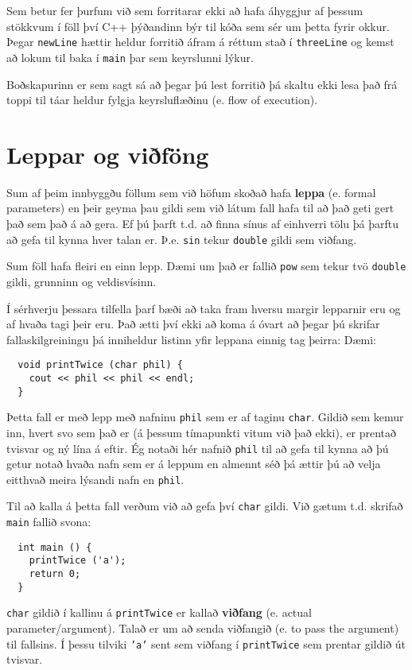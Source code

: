 Sem betur fer þurfum við sem forritarar ekki að hafa áhyggjur af þessum stökkvum í föll því C++ þýðandinn býr til kóða sem sér um þetta fyrir okkur.
Þegar {\tt newLine} hættir heldur forritið áfram á réttum stað í {\tt threeLine} og kemst að lokum til baka í {\tt main} þar sem keyrslunni lýkur.

Boðskapurinn er sem sagt sá að þegar þú lest forritið þá skaltu ekki lesa það frá toppi til táar heldur fylgja keyrsluflæðinu (e. flow of execution).

\section {Leppar og viðföng}

Sum af þeim innbyggðu föllum sem við höfum skoðað hafa {\bf leppa} (e. formal parameters)
en þeir geyma þau gildi sem við látum fall hafa til að það geti gert það sem það á að gera.
Ef þú þarft t.d. að finna sínus af einhverri tölu þá þarftu að gefa til kynna hver talan er.
Þ.e. {\tt sin} tekur {\tt double} gildi sem viðfang.

Sum föll hafa fleiri en einn lepp.
Dæmi um það er fallið {\tt pow} sem tekur tvö {\tt double} gildi, grunninn og veldisvísinn.

Í sérhverju þessara tilfella þarf bæði að taka fram hversu margir lepparnir eru og af hvaða tagi þeir eru.
Það ætti því ekki að koma á óvart að þegar þú skrifar fallaskilgreiningu þá inniheldur listinn yfir leppana einnig tag þeirra:
Dæmi:

\begin{verbatim}
  void printTwice (char phil) {
    cout << phil << phil << endl;
  }
\end{verbatim}
%
Þetta fall er með lepp með nafninu {\tt phil} sem er af taginu {\tt char}.
Gildið sem kemur inn, hvert svo sem það er (á þessum tímapunkti vitum við það ekki), er prentað tvisvar og ný lína á eftir.
Ég notaði hér nafnið {\tt phil} til að gefa til kynna að þú getur notað hvaða nafn sem er á leppum en almennt séð þá ættir þú að velja eitthvað meira lýsandi nafn en {\tt phil}.

Til að kalla á þetta fall verðum við að gefa því {\tt char} gildi.
Við gætum t.d. skrifað {\tt main} fallið svona:

\begin{verbatim}
  int main () {
    printTwice ('a');
    return 0;
  }
\end{verbatim}
%
{\tt char} gildið í kallinu á {\tt printTwice} er kallað {\bf viðfang} (e. actual parameter/argument).
Talað er um að senda viðfangið (e. to pass the argument) til fallsins.
Í þessu tilviki {\tt 'a'} sent sem viðfang í {\tt printTwice} sem prentar gildið út tvisvar.

